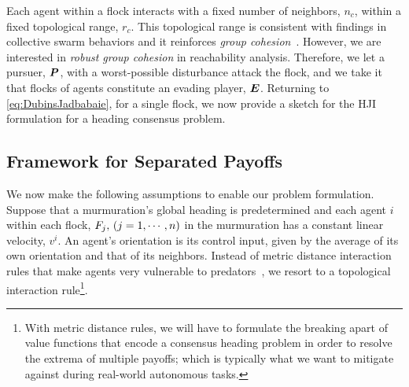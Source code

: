 %
%
Each agent within a flock interacts with a fixed number of neighbors, $n_c$, within a fixed topological range, $r_c$. This topological range %
is consistent with findings in collective swarm behaviors and it reinforces \textit{group cohesion}~\cite{Ballerini1232}. However, we are interested in \textit{robust group cohesion} in reachability analysis. Therefore, we let a pursuer, $\bm{P}$, with a worst-possible disturbance attack the flock, and we take it that flocks of agents constitute an evading player, $\bm{E}$. 
%
%
Returning to \eqref{eq:DubinsJadbabaie}, for a single flock, we now provide a sketch for the HJI formulation for a heading consensus problem. 

\subsection{Framework for Separated Payoffs}
%
We now make the following assumptions to enable our problem formulation.
%
Suppose that a murmuration's global heading is predetermined and each agent $i$ within each flock, $F_j,\, (j=1, \cdots, n)$ in the murmuration has a constant linear velocity, $v^i$. An agent's orientation is its control input, given by the average of its own orientation and that of its neighbors. Instead of metric distance interaction rules that make agents very vulnerable to predators~\cite{Ballerini1232}, we resort to a topological interaction rule\footnote{With metric distance rules, we will have to formulate the breaking apart of value functions that encode a consensus heading problem in order to resolve the extrema of multiple payoffs; which is typically what we want to mitigate against during real-world autonomous tasks.}. 


